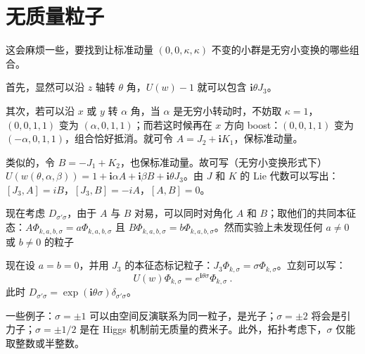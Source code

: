 \section{无质量粒子}
这会麻烦一些，要找到让标准动量 $(0, 0, \kappa, \kappa)$ 不变的小群是无穷小变换的哪些组合。

首先，显然可以沿 $z$ 轴转 $\theta$ 角，$U(w) - 1$ 就可以包含 $\mathbf{i} \theta J_3$。

其次，若可以沿 $x$ 或 $y$ 转 $\alpha$ 角，当 $\alpha$ 是无穷小转动时，不妨取 $\kappa = 1$，$(0, 0, 1, 1)$ 变为 $(\alpha, 0, 1, 1)$；而若这时候再在 $x$ 方向 boost：$(0, 0, 1, 1)$ 变为 $(-\alpha, 0, 1, 1)$，组合恰好抵消。就可令 $A = J_2 + \mathbf{i} K_1$，保标准动量。

类似的，令 $B = -J_1 + K_2$，也保标准动量。故可写（无穷小变换形式下） $U(w(\theta, \alpha, \beta)) = 1 + \mathbf{i} \alpha A + \mathbf{i} \beta B + \mathbf{i} \theta J_3$。由 $J$ 和 $K$ 的 Lie 代数可以写出：$[J_3, A] = iB$，$[J_3, B] = -iA$，$[A, B] = 0$。

现在考虑 $D_{\sigma' \sigma}$，由于 $A$ 与 $B$ 对易，可以同时对角化 $A$ 和 $B$；取他们的共同本征态：$A \Phi_{k, a, b, \sigma} = a \Phi_{k, a, b, \sigma}$ 且 $B \Phi_{k, a, b, \sigma} = b \Phi_{k, a, b, \sigma}$。然而实验上未发现任何 $a \neq 0$ 或 $b \neq 0$ 的粒子

现在设 $a=b=0$，并用 $J_3$ 的本征态标记粒子：$J_3 \Phi_{k, \sigma} = \sigma \Phi_{k, \sigma}$。立刻可以写：
\begin{equation}
	U(w) \Phi_{k, \sigma} = e^{\mathbf{i} \theta \sigma} \Phi_{k, \sigma} ~.
\end{equation}
此时 $D_{\sigma' \sigma} = \exp(\mathbf{i} \theta \sigma) \delta_{\sigma' \sigma}$。

一些例子：$\sigma = \pm 1$ 可以由空间反演联系为同一粒子，是光子；$\sigma = \pm 2$ 将会是引力子；$\sigma = \pm 1/2$ 是在 Higgs 机制前无质量的费米子。此外，拓扑考虑下，$\sigma$ 仅能取整数或半整数。